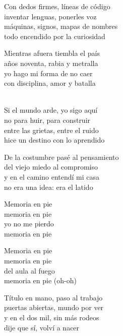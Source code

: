 \begin{lyrics}
Con dedos firmes, líneas de código\\
inventar lenguas, ponerles voz\\
máquinas, signos, mapas de nombres\\
todo encendido por la curiosidad

Mientras afuera tiembla el país\\
años noventa, rabia y metralla\\
yo hago mi forma de no caer\\
con disciplina, amor y batalla

\\
Si el mundo arde, yo sigo aquí\\
no para huir, para construir\\
entre las grietas, entre el ruido\\
hice un destino con lo aprendido

De la costumbre pasé al pensamiento\\
del viejo miedo al compromiso\\
y en el camino entendí mi casa\\
no era una idea: era el latido

Memoria en pie\\
memoria en pie\\
yo no me pierdo\\
memoria en pie

Memoria en pie\\
memoria en pie\\
del aula al fuego\\
memoria en pie
(oh-oh)

Título en mano, paso al trabajo\\
puertas abiertas, mundo por ver\\
y en el dos mil, sin más rodeos\\
dije que sí, volví a nacer
\end{lyrics}

